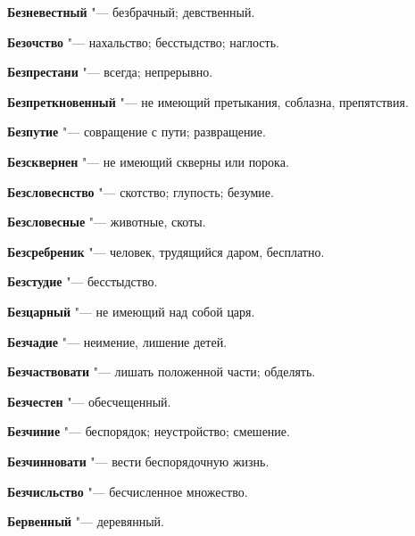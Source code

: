 \begin{mymulticols}{2}
\noindent\textbf{Безневестный} "--- безбрачный; девственный. 




\noindent\textbf{Безочство} "--- нахальство; бесстыдство; наглость. 




\noindent\textbf{Безпрестани} "--- всегда; непрерывно. 




\noindent\textbf{Безпреткновенный} "--- не имеющий претыкания, соблазна, препятствия. 




\noindent\textbf{Безпутие} "--- совращение с пути; развращение. 




\noindent\textbf{Безсквернен} "--- не имеющий скверны или порока. 




\noindent\textbf{Безсловеснство} "--- скотство; глупость; безумие. 




\noindent\textbf{Безсловесные} "--- животные, скоты. 




\noindent\textbf{Безсребреник} "--- человек, трудящийся даром, бесплатно. 




\noindent\textbf{Безстудие} "--- бесстыдство. 




\noindent\textbf{Безцарный} "--- не имеющий над собой царя. 




\noindent\textbf{Безчадие} "--- неимение, лишение детей. 




\noindent\textbf{Безчаствовати} "--- лишать положенной части; обделять. 




\noindent\textbf{Безчестен} "--- обесчещенный. 




\noindent\textbf{Безчиние} "--- беспорядок; неустройство; смешение. 




\noindent\textbf{Безчинновати} "--- вести беспорядочную жизнь. 




\noindent\textbf{Безчисльство} "--- бесчисленное множество. 




\noindent\textbf{Бервенный} "--- деревянный. 





\end{mymulticols}
